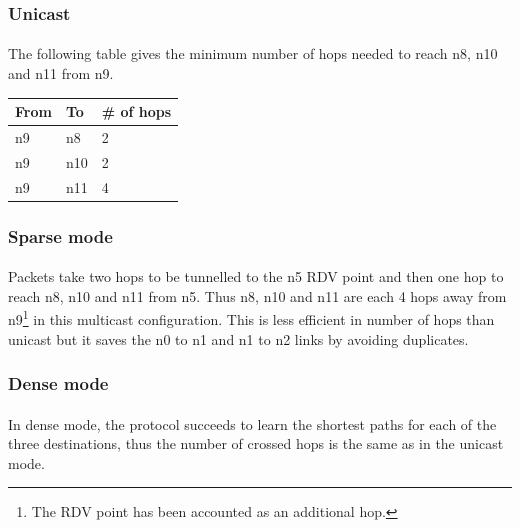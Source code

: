 \documentclass[a4paper]{article}
\begin{document}
   \subsubsection{Unicast}

    \paragraph{}The following table gives the minimum number of hops needed to
reach n8, n10 and n11 from n9.

    \begin{center}
            \begin{tabular}{|l|l|l|}
                \hline
                From & To & \# of hops \\
                \hline
                n9 & n8  & 2 \\
                n9 & n10 & 2 \\
                n9 & n11 & 4 \\
                \hline
            \end{tabular}
    \end{center}

   \subsubsection{Sparse mode}

    \paragraph{}Packets take two hops to be tunnelled to the n5 RDV point and
then one hop to reach n8, n10 and n11 from n5. Thus n8, n10 and n11 are each 4
hops away from n9\footnote{The RDV point has been accounted as an additional
hop.} in this multicast configuration. This is less efficient in number of hops
than unicast but it saves the n0 to n1 and n1 to n2 links by avoiding
duplicates.

   \subsubsection{Dense mode}

    \paragraph{}In dense mode, the protocol succeeds to learn the shortest
paths for each of the three destinations, thus the number of crossed hops is
the same as in the unicast mode.
\end{document}

